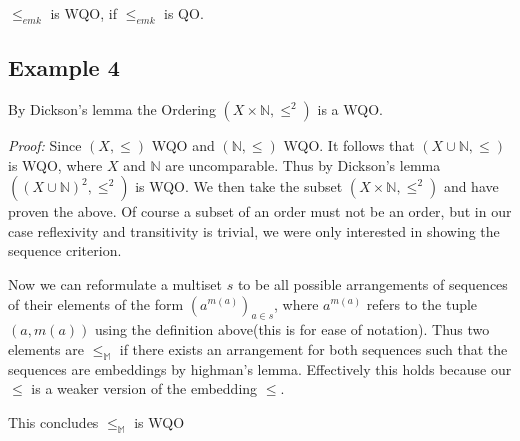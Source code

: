 $\leq_{emk}$ is WQO, if $\leq_{emk}$ is QO.

\subsection{Example 4}

By Dickson's lemma the Ordering $(X \times \mathbb{N},\leq^2)$ is a WQO. 

\textit{Proof:} Since $(X,\leq)$ WQO and $(\mathbb{N},\leq)$ WQO. It follows that $(X \cup \mathbb{N},\leq)$ is WQO, where $X$ and $\mathbb{N}$ are uncomparable. Thus by Dickson's lemma $((X \cup \mathbb{N})^2,\leq^2)$ is WQO. We then take the subset $(X \times \mathbb{N},\leq^2)$ and have proven the above. Of course a subset of an order must not be an order, but in our case reflexivity and transitivity is trivial, we were only interested in showing the sequence criterion.

Now we can reformulate a multiset $s$ to be all possible arrangements of sequences of their elements of the form $(a^{m(a)})_{a \in s}$, where $a^{m(a)}$ refers to the tuple $(a,m(a))$ using the definition above(this is for ease of notation). Thus two elements are $\leq_{\mathbb{M}}$ if there exists an arrangement for both sequences such that the sequences are embeddings by highman's lemma. Effectively this holds because our $\leq$ is a weaker version of the embedding $\leq$.

This concludes $\leq_\mathbb{M}$ is WQO